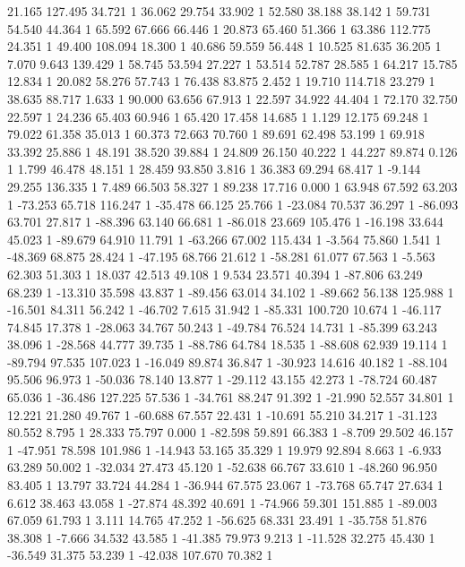 	21.165 127.495 34.721 1
	36.062 29.754 33.902 1
	52.580 38.188 38.142 1
	59.731 54.540 44.364 1
	65.592 67.666 66.446 1
	20.873 65.460 51.366 1
	63.386 112.775 24.351 1
	49.400 108.094 18.300 1
	40.686 59.559 56.448 1
	10.525 81.635 36.205 1
	7.070 9.643 139.429 1
	58.745 53.594 27.227 1
	53.514 52.787 28.585 1
	64.217 15.785 12.834 1
	20.082 58.276 57.743 1
	76.438 83.875 2.452 1
	19.710 114.718 23.279 1
	38.635 88.717 1.633 1
	90.000 63.656 67.913 1
	22.597 34.922 44.404 1
	72.170 32.750 22.597 1
	24.236 65.403 60.946 1
	65.420 17.458 14.685 1
	1.129 12.175 69.248 1
	79.022 61.358 35.013 1
	60.373 72.663 70.760 1
	89.691 62.498 53.199 1
	69.918 33.392 25.886 1
	48.191 38.520 39.884 1
	24.809 26.150 40.222 1
	44.227 89.874 0.126 1
	1.799 46.478 48.151 1
	28.459 93.850 3.816 1
	36.383 69.294 68.417 1
	-9.144 29.255 136.335 1
	7.489 66.503 58.327 1
	89.238 17.716 0.000 1
	63.948 67.592 63.203 1
	-73.253 65.718 116.247 1
	-35.478 66.125 25.766 1
	-23.084 70.537 36.297 1
	-86.093 63.701 27.817 1
	-88.396 63.140 66.681 1
	-86.018 23.669 105.476 1
	-16.198 33.644 45.023 1
	-89.679 64.910 11.791 1
	-63.266 67.002 115.434 1
	-3.564 75.860 1.541 1
	-48.369 68.875 28.424 1
	-47.195 68.766 21.612 1
	-58.281 61.077 67.563 1
	-5.563 62.303 51.303 1
	18.037 42.513 49.108 1
	9.534 23.571 40.394 1
	-87.806 63.249 68.239 1
	-13.310 35.598 43.837 1
	-89.456 63.014 34.102 1
	-89.662 56.138 125.988 1
	-16.501 84.311 56.242 1
	-46.702 7.615 31.942 1
	-85.331 100.720 10.674 1
	-46.117 74.845 17.378 1
	-28.063 34.767 50.243 1
	-49.784 76.524 14.731 1
	-85.399 63.243 38.096 1
	-28.568 44.777 39.735 1
	-88.786 64.784 18.535 1
	-88.608 62.939 19.114 1
	-89.794 97.535 107.023 1
	-16.049 89.874 36.847 1
	-30.923 14.616 40.182 1
	-88.104 95.506 96.973 1
	-50.036 78.140 13.877 1
	-29.112 43.155 42.273 1
	-78.724 60.487 65.036 1
	-36.486 127.225 57.536 1
	-34.761 88.247 91.392 1
	-21.990 52.557 34.801 1
	12.221 21.280 49.767 1
	-60.688 67.557 22.431 1
	-10.691 55.210 34.217 1
	-31.123 80.552 8.795 1
	28.333 75.797 0.000 1
	-82.598 59.891 66.383 1
	-8.709 29.502 46.157 1
	-47.951 78.598 101.986 1
	-14.943 53.165 35.329 1
	19.979 92.894 8.663 1
	-6.933 63.289 50.002 1
	-32.034 27.473 45.120 1
	-52.638 66.767 33.610 1
	-48.260 96.950 83.405 1
	13.797 33.724 44.284 1
	-36.944 67.575 23.067 1
	-73.768 65.747 27.634 1
	6.612 38.463 43.058 1
	-27.874 48.392 40.691 1
	-74.966 59.301 151.885 1
	-89.003 67.059 61.793 1
	3.111 14.765 47.252 1
	-56.625 68.331 23.491 1
	-35.758 51.876 38.308 1
	-7.666 34.532 43.585 1
	-41.385 79.973 9.213 1
	-11.528 32.275 45.430 1
	-36.549 31.375 53.239 1
	-42.038 107.670 70.382 1
